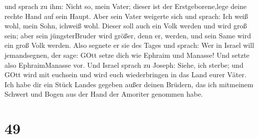 und sprach zu ihm: Nicht so, mein Vater; dieser ist der
Erstgeborene,lege deine rechte Hand auf sein Haupt.  Aber
sein Vater weigerte sich und sprach: Ich weiß wohl, mein Sohn, ichweiß
wohl. Dieser soll auch ein Volk werden und wird groß sein; aber sein
jüngsterBruder wird größer, denn er, werden, und sein Same wird ein groß
Volk werden.  Also segnete er sie des Tages und sprach: Wer
in Israel will jemandsegnen, der sage: GOtt setze dich wie Ephraim und
Manasse! Und setzte also EphraimManasse vor.  Und Israel
sprach zu Joseph: Siehe, ich sterbe; und GOtt wird mit euchsein und wird
euch wiederbringen in das Land eurer Väter.  Ich habe dir
ein Stück Landes gegeben außer deinen Brüdern, das ich mitmeinem Schwert
und Bogen aus der Hand der Amoriter genommen habe.

\hypertarget{section-48}{%
\section{49}\label{section-48}}

